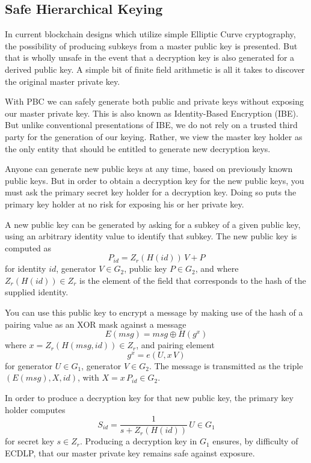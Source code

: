 \documentclass{yellowpaper}
\begin{document}
\subsection{Safe Hierarchical Keying}

In current blockchain designs which utilize simple Elliptic Curve cryptography, the possibility of producing subkeys from a master public key is presented. But that is wholly unsafe in the event that a decryption key is also generated for a derived public key. A simple bit of finite field arithmetic is all it takes to discover the original master private key.

With PBC we can safely generate both public and private keys without exposing our master private key. This is also known as Identity-Based Encryption (IBE). But unlike conventional presentations of IBE, we do not rely on a trusted third party for the generation of our keying. Rather, we view the master key holder as the only entity that should be entitled to generate new decryption keys. 

Anyone can generate new public keys at any time, based on previously known public keys.
But in order to obtain a decryption key for the new public keys, you must ask the primary secret key holder for a decryption key. Doing so puts the primary key holder at no risk for exposing his or her private key.

A new public key can be generated by asking for a subkey of a given public key, using an arbitrary identity value to identify that subkey. The new public key is computed as 
$$ P_{id} = Z_r(H(id)) \, V + P$$ 
for identity $id$, generator $V \in G_2$, public key $P \in G_2$, and where $Z_r(H(id)) \in Z_r$ is the element of the field that corresponds to the hash of the supplied identity. 

You can use this public key to encrypt a message by making use of the hash of a pairing value as an XOR mask against a message $$E(msg) = msg \oplus H(g^x)$$ where $x = Z_r(H(msg, id)) \in Z_r$, and pairing element 
$$g^x = e(U, x \, V)$$
for generator $U \in G_1$, generator $V \in G_2$. The message is transmitted as the triple $(E(msg), X, id)$, with $X = x \, P_{id} \in G_2$.

In order to produce a decryption key for that new public key, the primary key holder computes $$S_{id} = \frac{1}{s + Z_r(H(id))} \, U \in G_1$$ for secret key $s \in Z_r$. Producing a decryption key in $G_1$ ensures, by difficulty of ECDLP, that our master private key remains safe against exposure.
\end{document}
